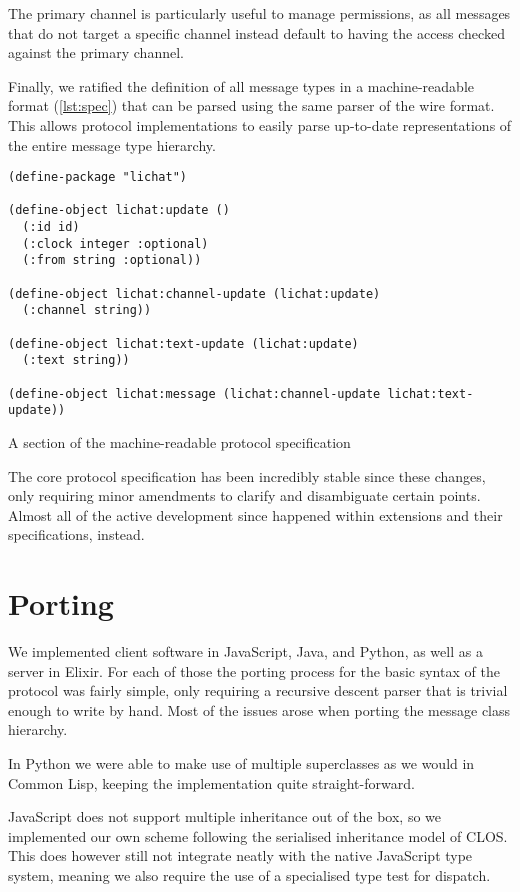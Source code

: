 \documentclass[format=sigconf]{acmart}
\begin{document}
The primary channel is particularly useful to manage permissions, as all messages that do not target a specific channel instead default to having the access checked against the primary channel.

Finally, we ratified the definition of all message types in a machine-readable format (\autoref{lst:spec}) that can be parsed using the same parser of the wire format. This allows protocol implementations to easily parse up-to-date representations of the entire message type hierarchy.

\begin{listing}
\begin{verbatim}
(define-package "lichat")

(define-object lichat:update ()
  (:id id)
  (:clock integer :optional)
  (:from string :optional))

(define-object lichat:channel-update (lichat:update)
  (:channel string))

(define-object lichat:text-update (lichat:update)
  (:text string))

(define-object lichat:message (lichat:channel-update lichat:text-update))
\end{verbatim}
\caption{A section of the machine-readable protocol specification}
\label{lst:spec}
\end{listing}

The core protocol specification has been incredibly stable since these changes, only requiring minor amendments to clarify and disambiguate certain points. Almost all of the active development since happened within extensions and their specifications, instead.

\section{Porting}
We implemented client software in JavaScript, Java, and Python, as well as a server in Elixir. For each of those the porting process for the basic syntax of the protocol was fairly simple, only requiring a recursive descent parser that is trivial enough to write by hand. Most of the issues arose when porting the message class hierarchy.

In Python we were able to make use of multiple superclasses as we would in Common Lisp, keeping the implementation quite straight-forward.

JavaScript does not support multiple inheritance out of the box, so we implemented our own scheme following the serialised inheritance model of CLOS. This does however still not integrate neatly with the native JavaScript type system, meaning we also require the use of a specialised type test for dispatch.
\end{document}
